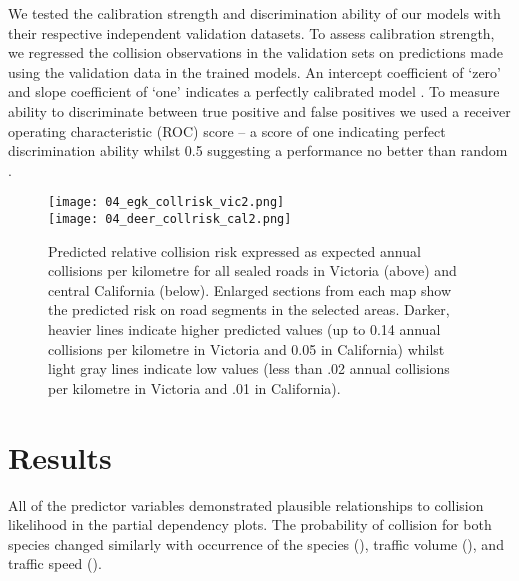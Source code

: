 We tested the calibration strength and discrimination ability of our models with their respective independent validation datasets. To assess calibration strength, we regressed the collision observations in the validation sets on predictions made using the validation data in the trained models. An intercept coefficient of `zero' and slope coefficient of `one' indicates a perfectly calibrated model \citep[see][]{mill91}. To measure ability to discriminate between true positive and false positives we used a receiver operating characteristic (ROC) score -- a score of one indicating perfect discrimination ability whilst 0.5 suggesting a performance no better than random \citep[see][]{metz78}.

\begin{figure*}[!t]
  \centering
  \texttt{[image: 04\_egk\_collrisk\_vic2.png]}\\
  \texttt{[image: 04\_deer\_collrisk\_cal2.png]}
  \caption[Predicted relative collision risk for all sealed roads in Victoria and central California]{Predicted relative collision risk expressed as expected annual collisions per kilometre for all sealed roads in Victoria (above) and central California (below).  Enlarged sections from each map show the predicted risk on road segments in the selected areas. Darker, heavier lines indicate higher predicted values (up to 0.14 annual collisions per kilometre in Victoria and 0.05 in California) whilst light gray lines indicate low values (less than .02 annual collisions per kilometre in Victoria and .01 in California).}
  \label{cal_coll_preds}
\end{figure*}

\section{Results}

All of the predictor variables demonstrated plausible relationships to collision likelihood in the partial dependency plots. The probability of collision for both species changed similarly with occurrence of the species (), traffic volume (), and traffic speed ().

